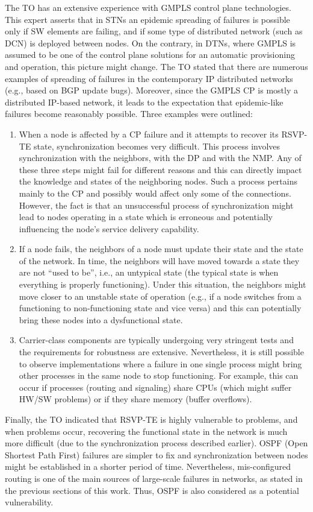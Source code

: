 \documentclass[10pt,draftclsnofoot,onecolumn,journal]{IEEEtran}
\begin{document}
The TO has an extensive experience with GMPLS control plane technologies. This expert asserts that in STNs an epidemic spreading of failures is possible only if SW elements are failing, and if some type of distributed network (such as DCN) is deployed between nodes. On the contrary, in DTNs, where GMPLS is assumed to be one of the control plane solutions for an automatic provisioning and operation, this picture might change. The TO stated that there are numerous examples of spreading of failures in the contemporary IP distributed networks (e.g., based on BGP update bugs). Moreover, since the GMPLS CP is mostly a distributed IP-based network, it leads to the expectation that epidemic-like failures become reasonably possible. Three examples were outlined:
\begin{enumerate}
	\item When a node is affected by a CP failure and it attempts to recover its RSVP-TE state, synchronization becomes very difficult. This process involves synchronization with the neighbors, with the DP and with the NMP. Any of these three steps might fail for different reasons and this can directly impact the knowledge and states of the neighboring nodes. Such a process pertains mainly to the CP and possibly would affect only some of the connections. However, the fact is that an unsuccessful process of synchronization might lead to nodes operating in a state which is erroneous and potentially influencing the node's service delivery capability. 
	\item If a node fails, the neighbors of a node must update their state and the state of the network. In time, the neighbors will have moved towards a state they are not ``used to be'', i.e., an untypical state (the typical state is when everything is properly functioning). Under this situation, the neighbors might move closer to an unstable state of operation (e.g., if a node switches from a functioning to non-functioning state and vice versa) and this can potentially bring these nodes into a dysfunctional state. 
	\item Carrier-class components are typically undergoing very stringent tests and the requirements for robustness are extensive. Nevertheless, it is still possible to observe implementations where a failure in one single process might bring other processes in the same node to stop functioning. For example, this can occur if processes (routing and signaling) share CPUs (which might suffer HW/SW problems) or if they share memory (buffer overflows). \end{enumerate} 
Finally, the TO indicated that RSVP-TE is highly vulnerable to problems, and when problems occur, recovering the functional state in the network is much more difficult (due to the synchronization process described earlier). OSPF (Open Shortest Path First) failures are simpler to fix and synchronization between nodes might be established in a shorter period of time. Nevertheless, mis-configured routing is one of the main sources of large-scale failures in networks, as stated in the previous sections of this work. Thus, OSPF is also considered as a potential vulnerability.
\end{document}
